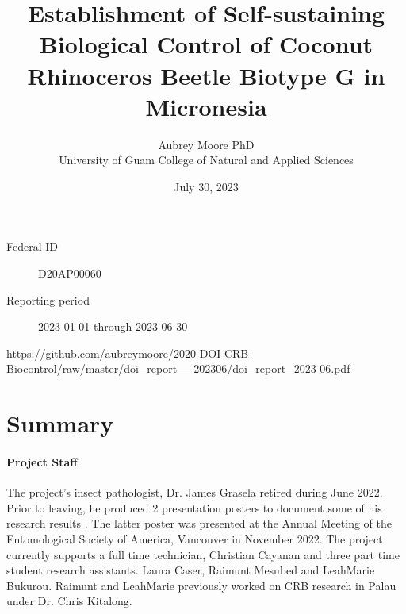 \documentclass[12pt,letterpaper,english,bibliography=totocnumbered, abstract=on]{scrartcl}
\begin{document}
\titlehead{Progress Report: DOI-OIA Coral Reef and Natural Resources Initiative FY2020}

\title{Establishment of Self-sustaining Biological Control of Coconut Rhinoceros Beetle Biotype G in Micronesia }

\author{Aubrey Moore PhD\\University of Guam College of Natural and Applied Sciences}

\date{July 30, 2023}

\maketitle

\begin{description}
	\item[Federal ID] D20AP00060
	\item[Reporting period] 2023-01-01 through 2023-06-30
\end{description}


\begin{footnotesize}
	\url{https://github.com/aubreymoore/2020-DOI-CRB-Biocontrol/raw/master/doi_report__202306/doi_report_2023-06.pdf}
\end{footnotesize}

\clearpage

\tableofcontents

\clearpage

\section*{Summary}
\noindent
	
\paragraph{Project Staff}
	The project's insect pathologist, Dr. James Grasela retired during June 2022. Prior to leaving, he produced 2 presentation posters to document some of his research results \cite{graselaPreliminaryDetectionWolbachia2022,graselaPreliminaryEffortsEstablish2022}. The latter poster was presented at the Annual Meeting of the Entomological Society of America, Vancouver in November 2022. The project currently supports a full time technician, Christian Cayanan and three part time student research assistants. Laura Caser, Raimunt Mesubed and LeahMarie Bukurou. Raimunt and LeahMarie previously worked on CRB research in Palau under Dr. Chris Kitalong.
	
\end{document}

